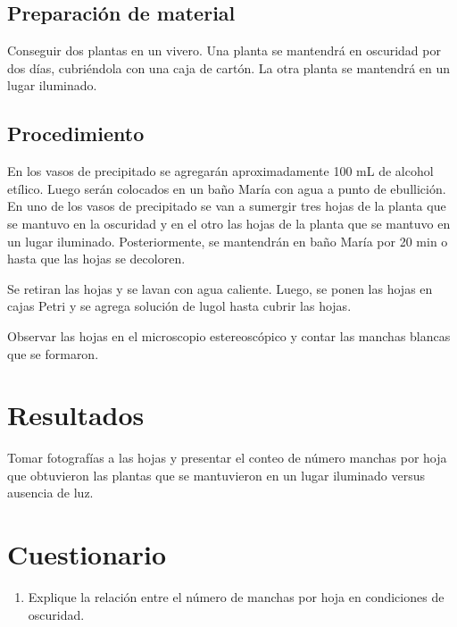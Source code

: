 \subsection{Preparaci\'on de material}

Conseguir dos plantas en un vivero. Una planta se mantendr\'a en oscuridad por dos d\'ias, cubriéndola con una caja de cart\'on. La otra planta se mantendr\'a en un lugar iluminado. 

\subsection{Procedimiento}

En los vasos de precipitado se agregar\'an aproximadamente 100 mL de alcohol et\'ilico. Luego ser\'an colocados en un ba\~no Mar\'ia con agua a punto de ebullici\'on. En uno de los vasos de precipitado se van a sumergir tres hojas de la planta que se mantuvo en la oscuridad y en el otro las hojas de la planta que se mantuvo en un lugar iluminado. Posteriormente, se mantendr\'an en ba\~no Mar\'ia  por 20 min o hasta que las hojas se decoloren. 

Se retiran las hojas y se lavan con agua caliente. Luego, se ponen las hojas en cajas Petri y se agrega soluci\'on de lugol hasta cubrir las hojas. 

Observar las hojas en el microscopio estereosc\'opico y contar las manchas blancas que se formaron.


\section{Resultados}

Tomar fotograf\'ias a las hojas y presentar el conteo de n\'umero manchas por hoja que obtuvieron las plantas que se mantuvieron en un lugar iluminado versus ausencia de luz.

\section{Cuestionario}

\begin{enumerate}
	\item Explique la relaci\'on entre el n\'umero de manchas por hoja en condiciones de oscuridad.

\end{enumerate}

